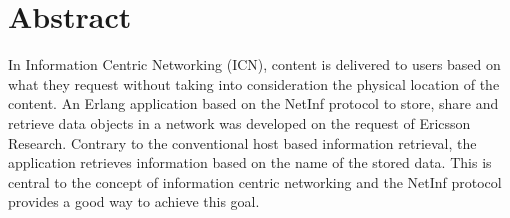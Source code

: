 \section{Abstract}
In Information Centric Networking (ICN), content is delivered to users based on what they request without taking into consideration the physical location of the content. An Erlang application based on the NetInf protocol to store, share and retrieve data objects in a network was developed on the request of Ericsson Research. Contrary to the conventional host based information retrieval, the application retrieves information based on the name of the stored data. This is central to the concept of information centric networking and the Net‌Inf protocol provides a good way to achieve this goal.    